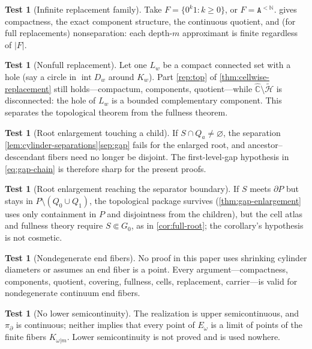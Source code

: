 \documentclass[11pt,reqno]{amsart}
\numberwithin{equation}{section}
\theoremstyle{plain}
\theoremstyle{definition}
\newtheorem{test}[theorem]{Test}
\theoremstyle{remark}
\newcommand{\Chat}{\widehat{\mathbb C}}
\newcommand{\N}{\mathbb N}
\newcommand{\A}{\mathtt A}
\newcommand{\Words}{\A^{<\N}}
\newcommand{\projB}{\pi_\partial}
\begin{document}
\begin{test}[Infinite replacement family]
\label{test:infinite}
Take $F=\{0^k1:k\ge0\}$, or $F=\Words$.
 gives compactness, the exact component
structure, the continuous quotient, and (for full replacements)
nonseparation: each depth-$m$ approximant is finite regardless of
$|F|$.
\end{test}

\begin{test}[Nonfull replacement]
\label{test:nonfull}
Let one $L_w$ be a compact connected set with a hole (say a circle in
$\operatorname{int}D_w$ around $K_w$).  Part \ref{rep:top} of
\cref{thm:cellwise-replacement} still holds---compactum, components,
quotient---while $\Chat\setminus\widetilde{\mathcal H}$ is
disconnected: the hole of $L_w$ is a bounded complementary component.
This separates the topological theorem from the fullness theorem.
\end{test}

\begin{test}[Root enlargement touching a child]
\label{test:root-touch}
If $S\cap Q_a\ne\varnothing$, the separation
\cref{lem:cylinder-separations}\ref{sep:gap} fails for the enlarged
root, and ancestor--descendant fibers need no longer be disjoint.  The
first-level-gap hypothesis in \eqref{eq:gap-chain} is therefore sharp
for the present proofs.
\end{test}

\begin{test}[Root enlargement reaching the separator boundary]
\label{test:root-boundary}
If $S$ meets $\partial P$ but stays in
$P\setminus(Q_0\cup Q_1)$, the topological package survives
(\cref{thm:gap-enlargement} uses only containment in $P$ and
disjointness from the children), but the cell atlas and fullness
theory require $S\Subset G_0$, as in \cref{cor:full-root}; the
corollary's hypothesis is not cosmetic.
\end{test}

\begin{test}[Nondegenerate end fibers]
\label{test:fat-ends}
No proof in this paper uses shrinking cylinder diameters or assumes an
end fiber is a point.  Every argument---compactness, components,
quotient, covering, fullness, cells, replacement, carrier---is valid
for nondegenerate continuum end fibers.
\end{test}

\begin{test}[No lower semicontinuity]
\label{test:no-lsc}
The realization is upper semicontinuous, and $\projB$ is continuous;
neither implies that every point of $E_\omega$ is a limit of points of
the finite fibers $K_{\omega|m}$.  Lower semicontinuity is not proved
and is used nowhere.
\end{test}
\end{document}
